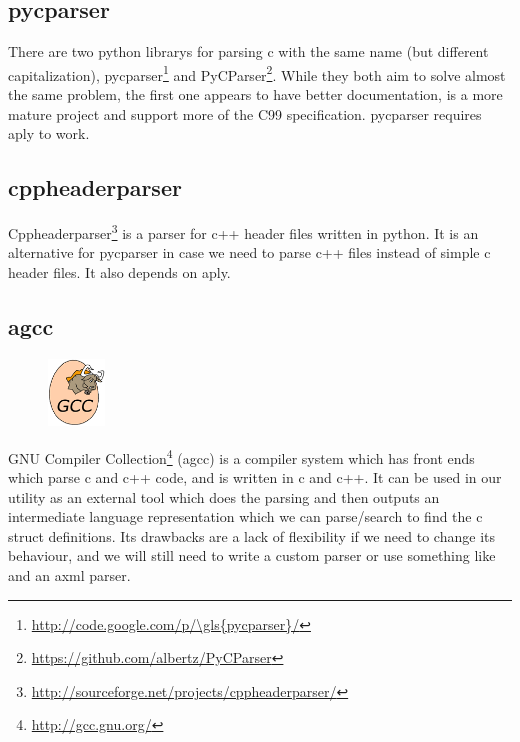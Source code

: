 \subsection{\gls{pycparser}}
\label{sec:pre:pycparser}
There are two \Gls{python} \glspl{library} for parsing \Gls{c} with the same name (but different
capitalization), \gls{pycparser}\footnote{\url{http://code.google.com/p/\gls{pycparser}/}}
and PyCParser\footnote{\url{https://github.com/albertz/PyCParser}}. While they
both aim to solve almost the same problem, the first one appears to have better
documentation, is a more mature project and support more of the C99
specification. \gls{pycparser} requires \Gls{aply} to work.

\subsection{cppheaderparser}
Cppheaderparser\footnote{\url{http://sourceforge.net/projects/cppheaderparser/}}
is a \gls{parser} for \Gls{c++} \gls{header} files written in \Gls{python}. It is an alternative for
\gls{pycparser} in case we need to parse \Gls{c++} files instead of simple \Gls{c} \gls{header} files.
It also depends on \Gls{aply}.

\subsection{\Gls{agcc}}
\label{sec:pre:gcc}
\begin{figure}
	\vspace{-20pt}
	\includegraphics[width=1.5cm]{./planning/img/gcc_logo}
	\vspace{-20pt}
\end{figure}
GNU Compiler Collection\footnote{\url{http://gcc.gnu.org/}} (\Gls{agcc}) is a
compiler system which has front ends which parse \Gls{c} and \Gls{c++} code, and is written
in \Gls{c} and \Gls{c++}. It can be used in our \gls{utility} as an external tool which does the
parsing and then outputs an intermediate language representation which we can
parse/search to find the \Gls{c} \gls{struct} definitions. Its drawbacks are a lack of
flexibility if we need to change its behaviour, and we will still need to write
a custom \gls{parser} or use something like  and an \Gls{axml} \gls{parser}.


